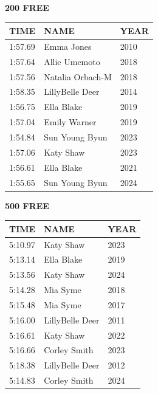 \begin{table}[H]
\centering
\begin{minipage}[t]{0.48\textwidth}
\centering
\textbf{200 FREE}\\[0.1cm]
\begin{tabular}{@{}p{1.8cm}p{2.8cm}p{1.2cm}@{}}
\hline
    \textbf{TIME} & \textbf{NAME} & \textbf{YEAR} \\
\hline
    1:57.69 & Emma Jones & 2010 \\
    1:57.64 & Allie Umemoto & 2018 \\
    1:57.56 & Natalia Orbach-M & 2018 \\
    1:58.35 & LillyBelle Deer & 2014 \\
    1:56.75 & Ella Blake & 2019 \\
    1:57.04 & Emily Warner & 2019 \\
    1:54.84 & Sun Young Byun & 2023 \\
    1:57.06 & Katy Shaw & 2023 \\
    1:56.61 & Ella Blake & 2021 \\
    1:55.65 & Sun Young Byun & 2024 \\
\hline
\end{tabular}
\end{minipage}\hfill
\begin{minipage}[t]{0.48\textwidth}
\centering
\textbf{500 FREE}\\[0.1cm]
\begin{tabular}{@{}p{1.8cm}p{2.8cm}p{1.2cm}@{}}
\hline
    \textbf{TIME} & \textbf{NAME} & \textbf{YEAR} \\
\hline
    5:10.97 & Katy Shaw & 2023 \\
    5:13.14 & Ella Blake & 2019 \\
    5:13.56 & Katy Shaw & 2024 \\
    5:14.28 & Mia Syme & 2018 \\
    5:15.48 & Mia Syme & 2017 \\
    5:16.00 & LillyBelle Deer & 2011 \\
    5:16.61 & Katy Shaw & 2022 \\
    5:16.66 & Corley Smith & 2023 \\
    5:18.38 & LillyBelle Deer & 2012 \\
    5:14.83 & Corley Smith & 2024 \\
\hline
\end{tabular}
\end{minipage}
\end{table}

